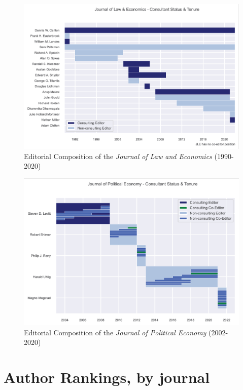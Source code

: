 \documentclass[11pt, letterpaper, twoside]{article}
\begin{document}
\begin{figure}[h]
    \centering
    \includegraphics[width=\textwidth]{figures/editors_jle_history.png}
    \caption{Editorial Composition of the \textit{Journal of Law and Economics} (1990-2020)}
\end{figure}
\begin{figure}[h]
    \centering
    \includegraphics[width=\textwidth]{figures/editors_jpe_history.png}
    \caption{Editorial Composition of the \textit{Journal of Political Economy} (2002-2020)}
\end{figure}








    
\appendix
\section{Author Rankings, by journal}


\newpage
\begin{landscape}
    \thispagestyle{empty}
        
\end{landscape}
\newpage
\begin{landscape}
    \thispagestyle{empty}
        
\end{landscape}
\newpage
\begin{landscape}
    \thispagestyle{empty}
    
\end{landscape}
    
\end{document}
